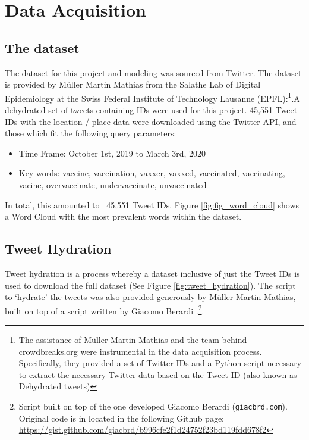 \documentclass[12pt]{article}
\begin{document}
\section{Data Acquisition}

\subsection{The dataset}
The dataset for this project and modeling was sourced from Twitter. The dataset is provided by Müller Martin Mathias from the Salathe Lab of Digital Epidemiology at the Swiss Federal Institute of Technology Lausanne (EPFL):\footnote{The assistance of Müller Martin Mathias and the team behind crowdbreaks.org were instrumental in the data acquisition process. Specifically, they provided a set of Twitter IDs and a Python script necessary to extract the necessary Twitter data based on the Tweet ID (also known as Dehydrated tweets)}.A dehydrated set of tweets containing IDs were used for this project. 45,551 Tweet IDs with the location / place data were downloaded using the Twitter API, and those which fit the following query parameters:

\begin{itemize}
\item Time Frame: October 1st, 2019 to March 3rd, 2020
\item Key words: vaccine, vaccination, vaxxer, vaxxed, vaccinated, vaccinating, vacine, overvaccinate, undervaccinate, unvaccinated
\end{itemize}

In total, this amounted to ~45,551 Tweet IDs. Figure  \ref{fig:fig_word_cloud} shows a Word Cloud with the most prevalent words within the dataset. 


\subsection{Tweet Hydration}
Tweet hydration is a process whereby a dataset inclusive of just the Tweet IDs is used to download the full dataset (See Figure \ref{fig:tweet_hydration}). The script to ‘hydrate’ the tweets was also provided generously by Müller Martin Mathias, built on top of a script written by Giacomo Berardi .\footnote{Script built on top of the one developed Giacomo Berardi  ({\tt giacbrd.com}). Original code is in located in the following Github page: \url{https://gist.github.com/giacbrd/b996cfe2f1d24752f23bd119fdd678f2}}. 
\end{document}
